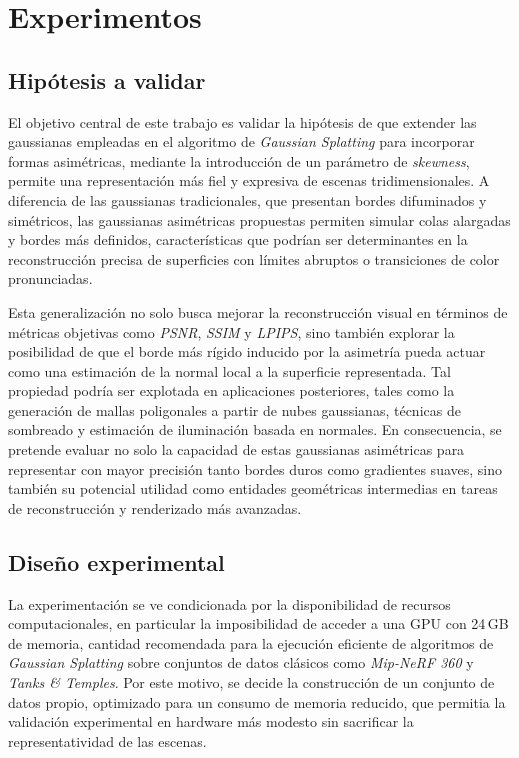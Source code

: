 \chapter{Experimentos}\label{chapter:experiments}

\section{Hipótesis a validar}

El objetivo central de este trabajo es validar la hipótesis de que extender las gaussianas empleadas en el algoritmo de \emph{Gaussian Splatting} para incorporar formas asimétricas, mediante la introducción de un parámetro de \emph{skewness}, permite una representación más fiel y expresiva de escenas tridimensionales. A diferencia de las gaussianas tradicionales, que presentan bordes difuminados y simétricos, las gaussianas asimétricas propuestas permiten simular colas alargadas y bordes más definidos, características que podrían ser determinantes en la reconstrucción precisa de superficies con límites abruptos o transiciones de color pronunciadas.

Esta generalización no solo busca mejorar la reconstrucción visual en términos de métricas objetivas como \emph{PSNR}, \emph{SSIM} y \emph{LPIPS}, sino también explorar la posibilidad de que el borde más rígido inducido por la asimetría pueda actuar como una estimación de la normal local a la superficie representada. Tal propiedad podría ser explotada en aplicaciones posteriores, tales como la generación de mallas poligonales a partir de nubes gaussianas, técnicas de sombreado y estimación de iluminación basada en normales. En consecuencia, se pretende evaluar no solo la capacidad de estas gaussianas asimétricas para representar con mayor precisión tanto bordes duros como gradientes suaves, sino también su potencial utilidad como entidades geométricas intermedias en tareas de reconstrucción y renderizado más avanzadas.

\section{Diseño experimental}

La experimentación se ve condicionada por la disponibilidad de recursos computacionales, en particular la imposibilidad de acceder a una GPU con 24\,GB de memoria, cantidad recomendada para la ejecución eficiente de algoritmos de \emph{Gaussian Splatting} sobre conjuntos de datos clásicos como \emph{Mip-NeRF 360} y \emph{Tanks \& Temples}. Por este motivo, se decide la construcción de un conjunto de datos propio, optimizado para un consumo de memoria reducido, que permitia la validación experimental en hardware más modesto sin sacrificar la representatividad de las escenas.

